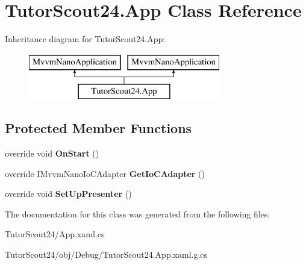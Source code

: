 \hypertarget{class_tutor_scout24_1_1_app}{}\section{Tutor\+Scout24.\+App Class Reference}
\label{class_tutor_scout24_1_1_app}
Inheritance diagram for Tutor\+Scout24.\+App\+:\begin{figure}[H]
\begin{center}
\leavevmode
\includegraphics[height=2.000000cm]{class_tutor_scout24_1_1_app}
\end{center}
\end{figure}
\subsection*{Protected Member Functions}
\begin{DoxyCompactItemize}
\item 
\mbox{\label{class_tutor_scout24_1_1_app_a0acdfb9361f5bc58d934821249c919f0}} 
override void {\bfseries On\+Start} ()
\item 
\mbox{\label{class_tutor_scout24_1_1_app_aa744e38f5b1f202879a9c9de920bba95}} 
override I\+Mvvm\+Nano\+Io\+C\+Adapter {\bfseries Get\+Io\+C\+Adapter} ()
\item 
\mbox{\label{class_tutor_scout24_1_1_app_a375c22905a6fdaa60f86e29c3a9b1ae4}} 
override void {\bfseries Set\+Up\+Presenter} ()
\end{DoxyCompactItemize}


The documentation for this class was generated from the following files\+:\begin{DoxyCompactItemize}
\item 
Tutor\+Scout24/App.\+xaml.\+cs\item 
Tutor\+Scout24/obj/\+Debug/Tutor\+Scout24.\+App.\+xaml.\+g.\+cs\end{DoxyCompactItemize}
